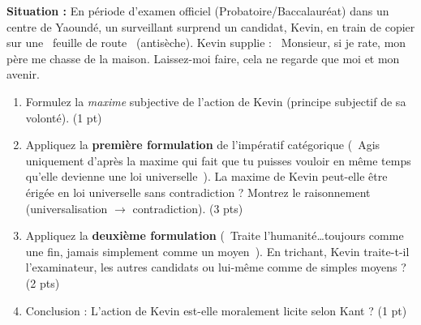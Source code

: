 \documentclass[11pt]{article}
\begin{document}
\begin{exercice}
\textbf{Situation :} En période d'examen officiel (Probatoire/Baccalauréat) dans un centre de Yaoundé, un surveillant surprend un candidat, Kevin, en train de copier sur une \og~feuille de route~{} (antisèche). Kevin supplie : \og~Monsieur, si je rate, mon père me chasse de la maison. Laissez-moi faire, cela ne regarde que moi et mon avenir.~{}
\begin{enumerate}
    \item Formulez la \textit{maxime} subjective de l'action de Kevin (principe subjectif de sa volonté). \hfill (1 pt)
    \item Appliquez la \textbf{première formulation} de l'impératif catégorique (\og~Agis uniquement d'après la maxime qui fait que tu puisses vouloir en même temps qu'elle devienne une loi universelle~{}). La maxime de Kevin peut-elle être érigée en loi universelle sans contradiction ? Montrez le raisonnement (universalisation $\rightarrow$ contradiction). \hfill (3 pts)
    \item Appliquez la \textbf{deuxième formulation} (\og~Traite l'humanité\dots toujours comme une fin, jamais simplement comme un moyen~{}). En trichant, Kevin traite-t-il l'examinateur, les autres candidats ou lui-même comme de simples moyens ? \hfill (2 pts)
    \item Conclusion : L'action de Kevin est-elle moralement licite selon Kant ? \hfill (1 pt)
\end{enumerate}
\end{exercice}
\end{document}
